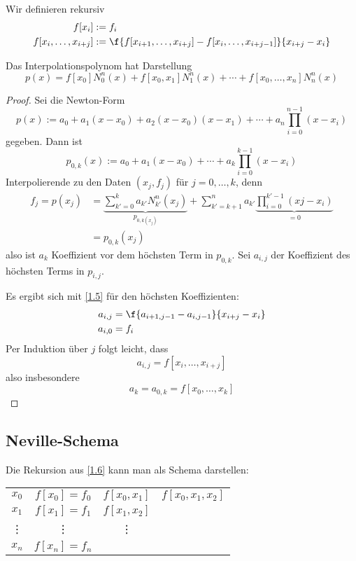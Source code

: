 \documentclass[11pt]{scrbook}
\begin{document}
\begin{df}
	\label{1.6}
	Wir definieren rekursiv
	\begin{align*}
		f[x_i] &:= f_i\\
		f[x_i,\dotsc,x_{i+j}] &:= \f {f[x_{i+1},\dotsc,x_{i+j}] - f[x_i,\dotsc,x_{i+j-1}]}{x_{i+j}-x_i}
	\end{align*}
\end{df}

\begin{st}
	\label{1.7}
	Das Interpolationspolynom hat Darstellung
	\[
		p(x) = f[x_0]N_0^n(x) + f[x_0,x_1]N_1^n(x) + \dotsb + f[x_0,\dotsc,x_n]N_n^n(x)
	\]
	\begin{proof}
		Sei die Newton-Form
		\[
			p(x) := a_0 + a_1(x-x_0) + a_2(x-x_0)(x-x_1) + \dotsb + a_n\prod_{i=0}^{n-1}(x-x_i)
		\]
		gegeben.
		Dann ist
		\[
			p_{0,k}(x) := a_0 + a_1(x-x_0) + \dotsb + a_k\prod_{i=0}^{k-1}(x-x_i)
		\]
		Interpolierende zu den Daten $(x_j,f_j)$ für $j=0,\dotsc,k$, denn
		\begin{align*}
			f_j = p(x_j) &= \underbrace{\sum_{k'=0}^ka_{k'}N_{k'}^n(x_j)}_{p_{0,k(x_j)}} + \sum_{k'=k+1}^n a_{k'}\underbrace{\prod_{i=0}^{k'-1}(xj-x_i)}_{=0}\\
			&= p_{0,k}(x_j)
		\end{align*}
		also ist $a_k$ Koeffizient vor dem höchsten Term in $p_{0,k}$.
		Sei $a_{i,j}$ der Koeffizient des höchsten Terms in $p_{i,j}$.

		Es ergibt sich mit \ref{1.5} für den höchsten Koeffizienten:
		\begin{align*}
			a_{i,j} &= \f {a_{i+1,j-1} - a_{i,j-1}}{x_{i+j}-x_i}\\
			a_{i,0} &= f_i
		\end{align*}
		Per Induktion über $j$ folgt leicht, dass
		\[
			a_{i,j} = f[x_i,\dotsc, x_{i+j}]
		\]
		also insbesondere
		\[
			a_k = a_{0,k} = f[x_0,\dotsc, x_k]
		\]
	\end{proof}
\end{st}

\subsection{Neville-Schema}

Die Rekursion aus \ref{1.6} kann man als Schema darstellen:

\begin{tabular}{cccc}
$x_0$ & $f[x_0]=f_0$ & $f[x_0,x_1]$ & $f[x_0,x_1,x_2]$ \\
$x_1$ & $f[x_1]=f_1$ & $f[x_1,x_2]$ &  \\
\vdots & \vdots & \vdots\\
$x_n$ & $f[x_n]=f_n$ &\\
\end{tabular}
\end{document}
